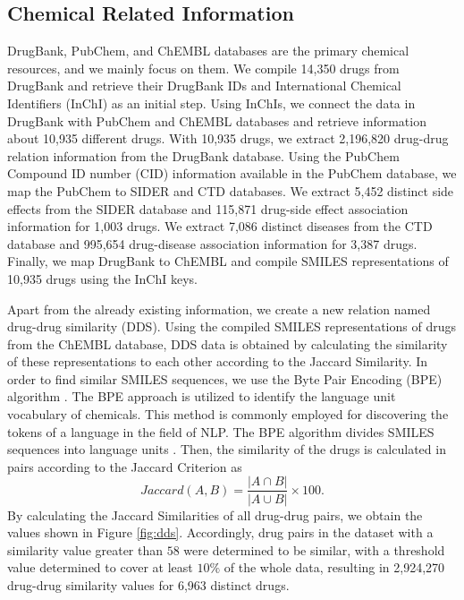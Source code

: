 \subsection{Chemical Related Information}
DrugBank, PubChem, and ChEMBL databases are the primary chemical resources, and we mainly focus on them. We compile 14,350 drugs from DrugBank and retrieve their DrugBank IDs and International Chemical Identifiers (InChI) as an initial step. Using InChIs, we connect the data in DrugBank with PubChem and ChEMBL databases and retrieve information about 10,935 different drugs. With 10,935 drugs, we extract 2,196,820 drug-drug relation information from the DrugBank database. Using the PubChem Compound ID number (CID) information available in the PubChem database, we map the PubChem to SIDER and CTD databases. We extract 5,452 distinct side effects from the SIDER database and 115,871 drug-side effect association information for 1,003 drugs. We extract 7,086 distinct diseases from the CTD database and 995,654 drug-disease association information for 3,387 drugs. Finally, we map DrugBank to ChEMBL and compile SMILES representations of 10,935 drugs using the InChI keys. 

Apart from the already existing information, we create a new relation named drug-drug similarity (DDS). Using the compiled SMILES representations of drugs from the ChEMBL database, DDS data is obtained by calculating the similarity of these representations to each other according to the Jaccard Similarity. In order to find similar SMILES sequences, we use the Byte Pair Encoding (BPE) algorithm \cite{sennrich2015neural}. The BPE approach is utilized to identify the language unit vocabulary of chemicals. This method is commonly employed for discovering the tokens of a language in the field of NLP. The BPE algorithm divides SMILES sequences into language units \cite{ozccelik2021debiaseddta}. Then, the similarity of the drugs is calculated in pairs according to the Jaccard Criterion as
\begin{equation}
    Jaccard (A, B) = \frac{|A \cap  B|}{ |A \cup B|} \times  100.
\label{eq:jaccard}
\end{equation}
By calculating the Jaccard Similarities of all drug-drug pairs, we obtain the values shown in Figure \ref{fig:dds}. Accordingly, drug pairs in the dataset with a similarity value greater than $58$ were determined to be similar, with a threshold value determined to cover at least $10\%$ of the whole data, resulting in 2,924,270 drug-drug similarity values for 6,963 distinct drugs.

